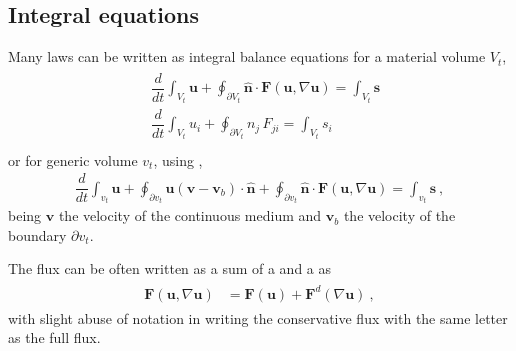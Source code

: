 \documentclass[letterpaper,10pt,english]{jupyterBook}
\begin{document}
\subsection{Integral equations}
\label{\detokenize{ch/pde/hyperbolic-intro:integral-equations}}\label{\detokenize{ch/pde/hyperbolic-intro:pde-hyperbolic-intro-integral}}
\sphinxAtStartPar
Many laws can be written as integral balance equations for a material volume \(V_t\),
\begin{equation*}
\begin{split}\begin{aligned}
  & \dfrac{d}{dt} \int_{V_t} \mathbf{u} + \oint_{\partial V_t} \hat{\mathbf{n}} \cdot \mathbf{F}(\mathbf{u}, \nabla \mathbf{u}) = \int_{V_t} \mathbf{s} \\
  & \dfrac{d}{dt} \int_{V_t} u_i + \oint_{\partial V_t} n_j \, F_{ji} = \int_{V_t} s_i \\
\end{aligned}\end{split}
\end{equation*}
\sphinxAtStartPar
or for generic volume \(v_t\), using {\hyperref[\detokenize{ch/tensor-algebra-calculus/time-derivative-of-integrals:tensor-calculus-time-derivative-of-integrals-volume-density}]{}},
\begin{equation*}
\begin{split}\dfrac{d}{dt} \int_{v_t} \mathbf{u} + \oint_{\partial v_t} \mathbf{u} \left( \mathbf{v} - \mathbf{v}_b \right) \cdot \hat{\mathbf{n}} + \oint_{\partial v_t} \hat{\mathbf{n}} \cdot \mathbf{F}(\mathbf{u}, \nabla \mathbf{u}) = \int_{v_t} \mathbf{s} \ ,\end{split}
\end{equation*}
\sphinxAtStartPar
being \(\mathbf{v}\) the velocity of the continuous medium and \(\mathbf{v}_b\) the velocity of the boundary \(\partial v_t\).

\sphinxAtStartPar
The flux can be often written as a sum of a  and a  as
\begin{equation*}
\begin{split}\begin{aligned}
  \mathbf{F}(\mathbf{u}, \nabla \mathbf{u})
  & = \mathbf{F}(\mathbf{u}) + \mathbf{F}^d(\nabla \mathbf{u}) \ ,
\end{aligned}\end{split}
\end{equation*}
\sphinxAtStartPar
with slight abuse of notation in writing the conservative flux with the same letter as the full flux.
\end{document}
